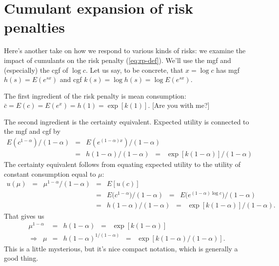 \documentclass[11pt]{article}
\newcommand{\cbar}{\bar{c}}
\begin{document}
\section{Cumulant expansion of risk penalties}

Here's another take on how we respond to various kinds of risks:
we examine the impact of cumulants on the risk penalty (\ref{eq:rp-def}).
We'll use the  mgf and (especially) the cgf of $\log c$.
Let us say, to be concrete,
that $x = \log c$ has mgf $h(s) = E (e^{sx})$ and cgf $k(s) = \log h(s) = \log E (e^{sx}) $.

The first ingredient of the risk penalty is mean consumption:
$\cbar = E(c) = E (e^x) = h(1) = \exp[k(1)]$.
[Are you with me?]

The second ingredient is the certainty equivalent.
Expected utility is connected to the mgf and cgf by
\begin{eqnarray*}
    E (c^{1-\alpha})/(1-\alpha) &=& E (e^{(1-\alpha) x})/(1-\alpha) \\
        &=&  h(1-\alpha)/(1-\alpha) \;\;=\;\; \exp[k(1-\alpha)]/(1-\alpha)
\end{eqnarray*}
The certainty equivalent follows from equating expected utility to the utility
of constant consumption equal to $\mu$:
\begin{eqnarray*}
    u (\mu) \;\;=\;\; \mu^{1-\alpha}/(1-\alpha)
            &=& E [u(c)]  \\
            &=& E \big( c^{1-\alpha} \big)/(1-\alpha)
                    \;\;=\;\; E \Big( e^{(1-\alpha) \log c} \Big)/(1-\alpha) \\
            &=& h(1-\alpha)/(1-\alpha) \;\;=\;\; \exp[k(1-\alpha)]/(1-\alpha) .
\end{eqnarray*}
That gives us
\begin{eqnarray*}
    \mu^{1-\alpha} &=& h(1-\alpha) \;\;=\;\; \exp[k(1-\alpha)] \\
    \Rightarrow \;\; \mu &=&  h(1-\alpha)^{1/(1-\alpha)} \;\;=\;\; \exp[k(1-\alpha)/(1-\alpha)]  .
\end{eqnarray*}
This is a little mysterious, but it's nice compact notation,
which is generally a good thing.
\end{document}
